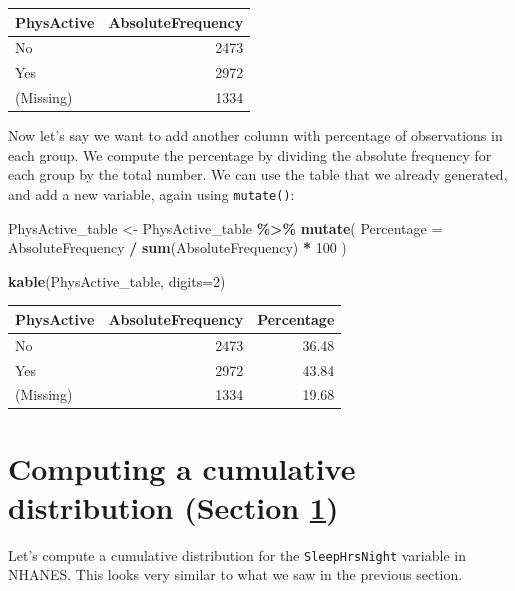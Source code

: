 \documentclass[
  12pt,
]{book}
\newenvironment{Shaded}{\begin{snugshade}}{\end{snugshade}}
\newcommand{\AttributeTok}[1]{\textcolor[rgb]{0.13,0.29,0.53}{#1}}
\newcommand{\DecValTok}[1]{\textcolor[rgb]{0.00,0.00,0.81}{#1}}
\newcommand{\FunctionTok}[1]{\textcolor[rgb]{0.13,0.29,0.53}{\textbf{#1}}}
\newcommand{\NormalTok}[1]{#1}
\newcommand{\OtherTok}[1]{\textcolor[rgb]{0.56,0.35,0.01}{#1}}
\newcommand{\SpecialCharTok}[1]{\textcolor[rgb]{0.81,0.36,0.00}{\textbf{#1}}}
\begin{document}
\begin{tabular}{l|r}
\hline
PhysActive & AbsoluteFrequency\\
\hline
No & 2473\\
\hline
Yes & 2972\\
\hline
(Missing) & 1334\\
\hline
\end{tabular}

Now let's say we want to add another column with percentage of observations in each group. We compute the percentage by dividing the absolute frequency for each group by the total number. We can use the table that we already generated, and add a new variable, again using \texttt{mutate()}:

\begin{Shaded}
\begin{Highlighting}[]
\NormalTok{PhysActive\_table }\OtherTok{\textless{}{-}}\NormalTok{ PhysActive\_table }\SpecialCharTok{\%\textgreater{}\%}
  \FunctionTok{mutate}\NormalTok{(}
    \AttributeTok{Percentage =}\NormalTok{ AbsoluteFrequency }\SpecialCharTok{/} 
      \FunctionTok{sum}\NormalTok{(AbsoluteFrequency) }\SpecialCharTok{*} \DecValTok{100}
\NormalTok{  )}

\FunctionTok{kable}\NormalTok{(PhysActive\_table, }\AttributeTok{digits=}\DecValTok{2}\NormalTok{)}
\end{Highlighting}
\end{Shaded}

\begin{tabular}{l|r|r}
\hline
PhysActive & AbsoluteFrequency & Percentage\\
\hline
No & 2473 & 36.48\\
\hline
Yes & 2972 & 43.84\\
\hline
(Missing) & 1334 & 19.68\\
\hline
\end{tabular}

\hypertarget{cumulative-distributions}{%
\section{Computing a cumulative distribution (Section \ref{cumulative-distributions})}\label{cumulative-distributions}}

Let's compute a cumulative distribution for the \texttt{SleepHrsNight} variable in NHANES. This looks very similar to what we saw in the previous section.
\end{document}
